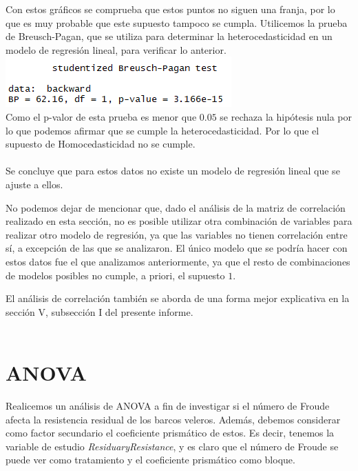 \documentclass[twoside]{article}
\begin{document}
\begin{multicols}{2}
Con estos gr\'aficos se comprueba que estos puntos no siguen una franja, por lo que es muy probable que este supuesto tampoco se cumpla. Utilicemos la prueba de Breusch-Pagan, que se utiliza para determinar la heterocedasticidad en un modelo de regresi\'on lineal, para verificar lo anterior.\\

\includegraphics[scale=0.6]{images/pic_11.png} \\

Como el p-valor de esta prueba es menor que $0.05$ se rechaza la hip\'otesis nula por lo que  podemos afirmar que se cumple la heterocedasticidad. Por lo que el supuesto de Homocedasticidad no se cumple.\\\\

Se concluye que para estos datos no existe un modelo de regresi\'on lineal que se ajuste a ellos. 

No podemos dejar de mencionar que, dado el an\'alisis de la matriz de correlaci\'on realizado en esta secci\'on, no es posible utilizar otra combinaci\'on de variables para realizar otro modelo de regresi\'on, ya que las variables no tienen correlaci\'on entre s\'i, a excepci\'on de las que se analizaron. El \'unico modelo que se podr\'ia hacer con estos datos fue el que analizamos anteriormente, ya que el resto de combinaciones de modelos posibles no cumple, a priori, el supuesto $1$.

El an\'alisis de correlaci\'on tambi\'en se aborda de una forma mejor explicativa en la secci\'on V, subsecci\'on I del presente informe.\\\\




\section{ANOVA}
Realicemos un an\'alisis de ANOVA a fin de investigar si el n\'umero de Froude afecta la resistencia residual de los barcos veleros. Adem\'as, debemos considerar como factor secundario el coeficiente prism\'atico de estos. Es decir, tenemos la variable de estudio \textit{ResiduaryResistance}, y es claro que el n\'umero de Froude se puede ver como tratamiento y el coeficiente prism\'atico como bloque.


\end{multicols}
\end{document}
